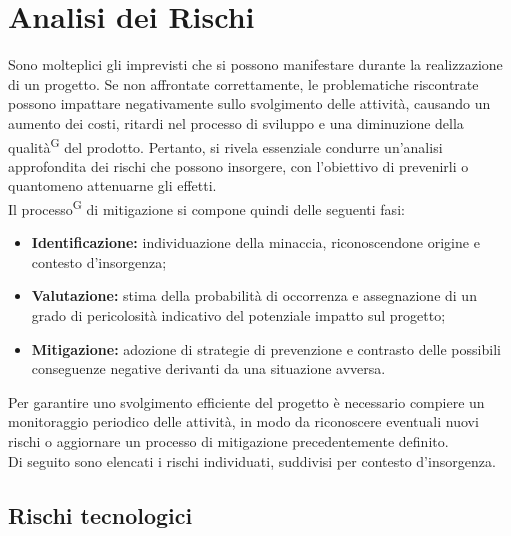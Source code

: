 \documentclass[8pt]{article}
\newcommand{\glossterm}[1]{#1\textsuperscript{G}} %
\begin{document}
\section{Analisi dei Rischi} \label{sec:rischi}
Sono molteplici gli imprevisti che si possono manifestare durante la realizzazione di un progetto. Se non affrontate correttamente, le problematiche riscontrate possono impattare negativamente sullo svolgimento delle attività, causando un aumento dei costi, ritardi nel processo di sviluppo e una diminuzione della \glossterm{qualità} del prodotto. Pertanto, si rivela essenziale condurre un'analisi approfondita dei rischi che possono insorgere, con l'obiettivo di prevenirli o quantomeno attenuarne gli effetti. \\
Il \glossterm{processo} di mitigazione si compone quindi delle seguenti fasi: 
\begin{itemize}
\setlength\itemsep{0em}
    \item \textbf{Identificazione:} individuazione della minaccia, riconoscendone origine e contesto d'insorgenza;
    \item \textbf{Valutazione:} stima della probabilità di occorrenza e assegnazione di un grado di pericolosità indicativo del potenziale impatto sul progetto;
    \item \textbf{Mitigazione:} adozione di strategie di prevenzione e contrasto delle possibili conseguenze negative derivanti da una situazione avversa.
\end{itemize}
Per garantire uno svolgimento efficiente del progetto è necessario compiere un monitoraggio periodico delle attività, in modo da riconoscere eventuali nuovi rischi o aggiornare un processo di mitigazione precedentemente definito. \\ Di seguito sono elencati i rischi individuati, suddivisi per contesto d'insorgenza.
\subsection{Rischi tecnologici}
\end{document}
